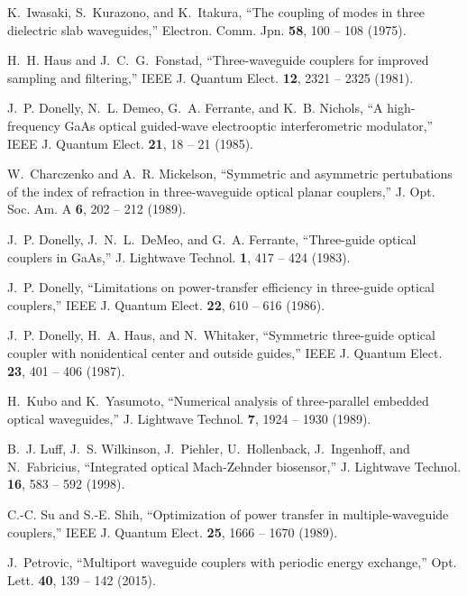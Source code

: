 \documentclass[9pt,twocolumn,twoside]{osajnl}
\begin{document}
\begin{thebibliography}{10}
\newcommand{\enquote}[1]{``#1''}

K.~Iwasaki, S.~Kurazono, and K.~Itakura, \enquote{The coupling of modes in
  three dielectric slab waveguides,} Electron. Comm. Jpn. \textbf{58}, 100 --
  108 (1975).

H.~H. Haus and J.~C.~G.~Fonstad, \enquote{Three-waveguide couplers for improved
  sampling and filtering,} IEEE J. Quantum Elect. \textbf{12}, 2321 -- 2325
  (1981).

J.~P. Donelly, N.~L. Demeo, G.~A. Ferrante, and K.~B. Nichols, \enquote{A
  high-frequency GaAs optical guided-wave electrooptic interferometric
  modulator,} IEEE J. Quantum Elect. \textbf{21}, 18 -- 21 (1985).

W.~Charczenko and A.~R. Mickelson, \enquote{Symmetric and asymmetric
  pertubations of the index of refraction in three-waveguide optical planar
  couplers,} J. Opt. Soc. Am. A \textbf{6}, 202 -- 212 (1989).

J.~P. Donelly, J.~N.~L.~DeMeo, and G.~A. Ferrante, \enquote{Three-guide optical
  couplers in GaAs,} J. Lightwave Technol. \textbf{1}, 417 -- 424 (1983).

J.~P. Donelly, \enquote{Limitations on power-transfer efficiency in three-guide
  optical couplers,} IEEE J. Quantum Elect. \textbf{22}, 610 -- 616 (1986).

J.~P. Donelly, H.~A. Haus, and N.~Whitaker, \enquote{Symmetric three-guide
  optical coupler with nonidentical center and outside guides,} IEEE J. Quantum
  Elect. \textbf{23}, 401 -- 406 (1987).

H.~Kubo and K.~Yasumoto, \enquote{Numerical analysis of three-parallel embedded
  optical waveguides,} J. Lightwave Technol. \textbf{7}, 1924 -- 1930 (1989).

B.~J. Luff, J.~S. Wilkinson, J.~Piehler, U.~Hollenback, J.~Ingenhoff, and
  N.~Fabricius, \enquote{Integrated optical Mach-Zehnder biosensor,} J.
  Lightwave Technol. \textbf{16}, 583 -- 592 (1998).

C.-C. Su and S.-E. Shih, \enquote{Optimization of power transfer in
  multiple-waveguide couplers,} IEEE J. Quantum Elect. \textbf{25}, 1666 --
  1670 (1989).

J.~Petrovic, \enquote{Multiport waveguide couplers with periodic energy
  exchange,} Opt. Lett. \textbf{40}, 139 -- 142 (2015).


\end{thebibliography}
\end{document}
